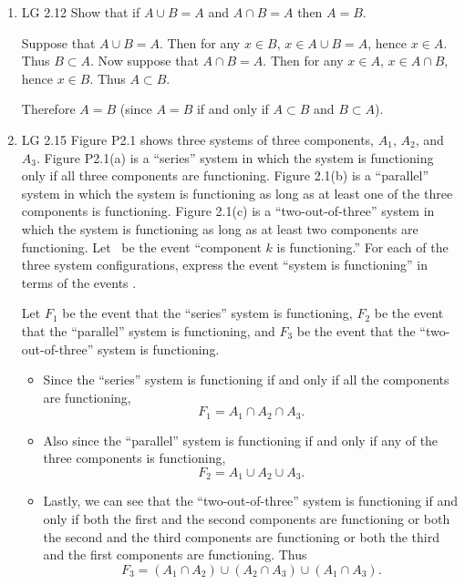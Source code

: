 \begin{enumerate}
	\item LG 2.12
	\ifdefined\sol
	Show that if $A\cup B = A$ and $A \cap B=A$ then $A=B$.
	\begin{solution}
	Suppose that $A\cup B = A$.
	Then for any $x\in B$, $x\in A\cup B = A$, hence $x\in A$.
	Thus $B\subset A$.
	Now suppose that $A\cap B = A$.
	Then for any $x\in A$, $x\in A\cap B$, hence $x\in B$.
	Thus $A\subset B$.

	Therefore $A=B$
	(since $A=B$ if and only if $A\subset B$ and $B\subset A$).
	\end{solution}
	\fi

	\item LG 2.15
	\ifdefined\sol
	Figure P2.1 shows three systems of three components,
	$A_1$, $A_2$, and $A_3$.
	Figure P2.1(a) is a ``series'' system in which
	the system is functioning
	only if all three components are functioning.
	Figure 2.1(b) is a ``parallel'' system
	in which the system is functioning as long as
	at least one of the three components is functioning.
	Figure 2.1(c) is a ``two-out-of-three'' system in which the system is functioning
	as long as at least two components are functioning.
	Let \Ak\ be the event ``component $k$ is functioning.''
	For each of the three system configurations,
	express the event ``system is functioning''
	in terms of the events \Ak.
	\begin{solution}
		Let $F_1$ be the event that the ``series'' system is functioning,
		$F_2$ be the event that the ``parallel'' system is functioning,
		and $F_3$ be the event that the ``two-out-of-three'' system is functioning.
		\begin{itemize}
			\item Since the ``series'' system is functioning
			if and only if all the components are functioning,
			\[
				F_1 = A_1 \cap A_2 \cap A_3.
			\]

			\item
			Also since the ``parallel'' system is functioning
			if and only if any of the three components is functioning,
			\[
				F_2 = A_1 \cup A_2 \cup A_3.
			\]

			\item
			Lastly, we can see that the ``two-out-of-three'' system is functioning
			if and only if
			both the first and the second components are functioning
			or both the second and the third components are functioning
			or both the third and the first components are functioning.
			Thus
			\[
				F_3 =
				(A_1 \cap A_2)
				\cup
				(A_2 \cap A_3)
				\cup
				(A_1 \cap A_3).
			\]
		\end{itemize}
	\end{solution}
	\fi



\end{enumerate}
